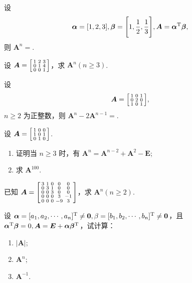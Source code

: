	\begin{titwo}
		设
		\[
			\bm \alpha = [1,2,3], \bm \beta = \Biggl[ 1,\frac{1}{2},\frac{1}{3} \Biggr], \bm A = \bm \alpha^{\mathrm{T}} \bm \beta,
		\]
		则 $\bm A^{n} = $\htwo.
	\end{titwo}

	\begin{titwo}
		设 $\bm A = \begin{bsmallmatrix}
			1 & 2 & 3 \\
			0 & 1 & 4 \\
			0 & 0 & 1
		\end{bsmallmatrix}$，求 $\bm A^{n} (n \geq 3)$.
	\end{titwo}

	\begin{titwo}
		设
		\[
			\bm A = \begin{bsmallmatrix}
				1 & 0 & 1 \\
				0 & 2 & 0 \\
				1 & 0 & 1
			\end{bsmallmatrix},
		\]
		$n \geq 2$ 为正整数，则 $\bm A^{n} - 2 \bm A^{n-1} = $\htwo.
	\end{titwo}

	\begin{titwo}
		设 $\bm A = \begin{bsmallmatrix}
			1 & 0 & 0 \\
			1 & 0 & 1 \\
			0 & 1 & 0
		\end{bsmallmatrix}$.
		\begin{enumerate}
			\item 证明当 $n \geq 3$ 时，有 $\bm A^{n} = \bm A^{n-2} + \bm A^{2} - \bm E$;
			\item 求 $\bm A^{100}$.
		\end{enumerate}
	\end{titwo}

	\begin{titwo}
		已知 $\bm A = \begin{bsmallmatrix}
			3 & 1 & 0 & 0 & 0 \\
			0 & 3 & 1 & 0 & 0 \\
			0 & 0 & 3 & 0 & 0 \\
			0 & 0 & 0 & 3 & -1 \\
			0 & 0 & 0 & -9 & 3
		\end{bsmallmatrix}$，求 $\bm A^{n}(n \geq 2)$.
	\end{titwo}

	\begin{titwo}
		设 $\bm \alpha = [a_{1},a_{2},\cdots,a_{n}]^{\mathrm{T}} \ne \bm 0, \beta = [b_{1},b_{2},\cdots,b_{n}]^{\mathrm{T}} \ne \bm 0$，且 $\bm \alpha^{\mathrm{T}} \bm \beta = 0, \bm A = \bm E + \bm \alpha \bm \beta^{\mathrm{T}}$，试计算：
		\begin{enumerate}
			\item $|\bm A|$;
			\item $\bm A^{n}$;
			\item $\bm A^{-1}$.
		\end{enumerate}
	\end{titwo}


